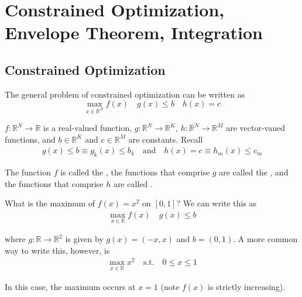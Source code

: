 \documentclass{article}
\begin{document}
\displayoptions

\section{Constrained Optimization, Envelope Theorem, Integration}
\label{sec:constrained_optimization_envelope_theorem_integration}

\localtableofcontents

\subsection{Constrained Optimization}
\label{sub:constrained_optimization}

The general problem of constrained optimization can be written as
\begin{equation}\label{eq:lecture5_main_problem}
  \max_{x \in \mathbb{R}^N} f(x)
  \quad
  g(x) \le b
  \quad
  h(x) = c
\end{equation}


$f: \mathbb{R}^N \to \mathbb{R}$ is a real-valued function, $g: \mathbb{R}^N \to \mathbb{R}^K$, $h: \mathbb{R}^N \to \mathbb{R}^M$ are vector-vaued functions, and $b \in \mathbb{R}^K$ and $c \in \mathbb{R}^M$ are constants. Recall
\begin{align*}
  g(x) \le b \equiv g_k(x) \le b_k
  \quad\text{and}\quad
  h(x) = c \equiv h_m(x) \le c_m
\end{align*}

The function $f$ is called the , the functions that comprise $g$ are called the , and the functions that comprise $h$ are called .

\begin{example}
  What is the maximum of $f(x) = x^2$ on $[0, 1]$? We can write this as
  \begin{align*}
    \max_{x \in \mathbb{R}} f(x)
    \quad
    g(x) \le b
  \end{align*}

  where $g: \mathbb{R} \to \mathbb{R}^2$ is given by $g(x) = (-x, x)$ and $b = (0, 1)$. A more common way to write this, however, is
  \begin{align*}
    \max_{x \in \mathbb{R}} x^2
    \quad\text{s.t.}\quad
    0 \le x \le 1
  \end{align*}

  In this case, the maximum occurs at $x = 1$ (note $f(x)$ is strictly increasing).
\end{example}
\end{document}
